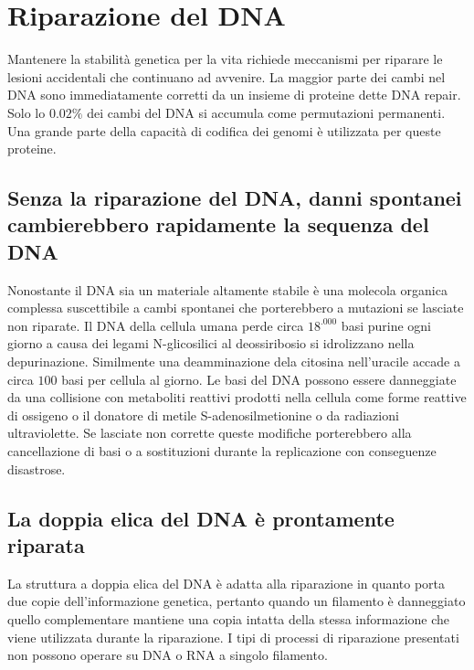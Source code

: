 \section{Riparazione del DNA}
Mantenere la stabilit\`a genetica per la vita richiede meccanismi per riparare le lesioni accidentali che continuano ad avvenire. La maggior parte dei cambi nel DNA sono immediatamente
corretti da un insieme di proteine dette DNA repair. Solo lo $0.02\%$ dei cambi del DNA si accumula come permutazioni permanenti. Una grande parte della capacit\`a di codifica dei genomi
\`e utilizzata per queste proteine. 
\subsection{Senza la riparazione del DNA, danni spontanei cambierebbero rapidamente la sequenza del DNA}
Nonostante il DNA sia un materiale altamente stabile \`e una molecola organica complessa suscettibile a cambi spontanei che porterebbero a mutazioni se lasciate non riparate. Il DNA 
della cellula umana perde circa $18^.000$ basi purine ogni giorno a causa dei legami N-glicosilici al deossiribosio si idrolizzano nella depurinazione. Similmente una deamminazione 
dela citosina nell'uracile accade a circa $100$ basi per cellula al giorno. Le basi del DNA possono essere danneggiate da una collisione con metaboliti reattivi prodotti nella cellula
come forme reattive di ossigeno o il donatore di metile S-adenosilmetionine o da radiazioni ultraviolette. Se lasciate non corrette queste modifiche porterebbero alla cancellazione di
basi o a sostituzioni durante la replicazione con conseguenze disastrose.
\subsection{La doppia elica del DNA \`e prontamente riparata}
La struttura a doppia elica del DNA \`e adatta alla riparazione in quanto porta due copie dell'informazione genetica, pertanto quando un filamento \`e danneggiato quello complementare
mantiene una copia intatta della stessa informazione che viene utilizzata durante la riparazione. I tipi di processi di riparazione presentati non possono operare su DNA o RNA a singolo
filamento. 
